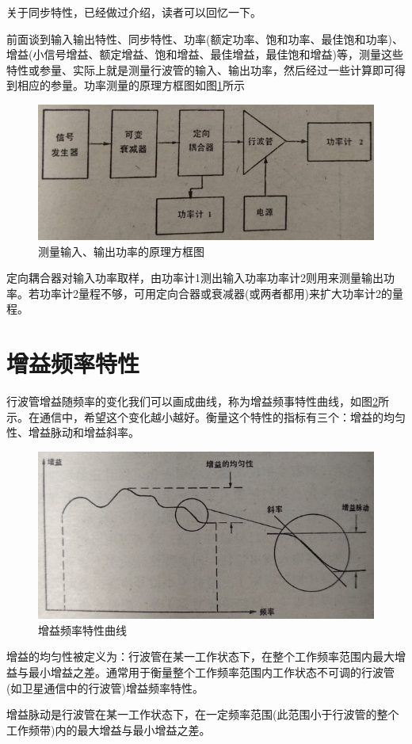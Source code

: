关于同步特性，已经做过介绍，读者可以回忆一下。

前面谈到输入输出特性、同步特性、功率(额定功率、饱和功率、最佳饱和功率)、增益(小信号增益、额定增益、饱和增益、最佳增益，最佳饱和增益)等，测量这些特性或参量、实际上就是测量行波管的输入、输出功率，然后经过一些计算即可得到相应的参量。功率测量的原理方框图如图\ref{ch11-4}所示

\begin{figure}[phtb]
	\centering
	\includegraphics[width=0.6\linewidth]{figure/ch11-4}
	\caption{测量输入、输出功率的原理方框图}
	\label{ch11-4}
\end{figure}

定向耦合器对输入功率取样，由功率计1测出输入功率功率计2则用来测量输出功率。若功率计2量程不够，可用定向合器或衰减器(或两者都用)来扩大功率计2的量程。
\section{增益频率特性}
行波管增益随频率的变化我们可以画成曲线，称为增益频事特性曲线，如图\ref{ch11-5}所示。在通信中，希望这个变化越小越好。衡量这个特性的指标有三个：增益的均匀性、增益脉动和增益斜率。

\begin{figure}[phtb]
	\centering
	\includegraphics[width=0.6\linewidth]{figure/ch11-5}
	\caption{增益频率特性曲线}
	\label{ch11-5}
\end{figure}

增益的均匀性被定义为：行波管在某一工作状态下，在整个工作频率范围内最大增益与最小增益之差。通常用于衡量整个工作频率范围内工作状态不可调的行波管(如卫星通信中的行波管)增益频率特性。


增益脉动是行波管在某一工作状态下，在一定频率范围(此范围小于行波管的整个工作频带)内的最大增益与最小增益之差。


